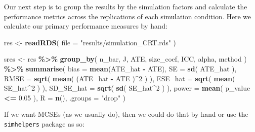 \documentclass[
]{book}
\newenvironment{Shaded}{\begin{snugshade}}{\end{snugshade}}
\newcommand{\AttributeTok}[1]{\textcolor[rgb]{0.13,0.29,0.53}{#1}}
\newcommand{\DecValTok}[1]{\textcolor[rgb]{0.00,0.00,0.81}{#1}}
\newcommand{\FloatTok}[1]{\textcolor[rgb]{0.00,0.00,0.81}{#1}}
\newcommand{\FunctionTok}[1]{\textcolor[rgb]{0.13,0.29,0.53}{\textbf{#1}}}
\newcommand{\NormalTok}[1]{#1}
\newcommand{\OtherTok}[1]{\textcolor[rgb]{0.56,0.35,0.01}{#1}}
\newcommand{\SpecialCharTok}[1]{\textcolor[rgb]{0.81,0.36,0.00}{\textbf{#1}}}
\newcommand{\StringTok}[1]{\textcolor[rgb]{0.31,0.60,0.02}{#1}}
\begin{document}
Our next step is to group the results by the simulation factors and calculate the performance metrics across the replications of each simulation condition.
Here we calculate our primary performance measures by hand:

\begin{Shaded}
\begin{Highlighting}[]
\NormalTok{res }\OtherTok{\textless{}{-}} \FunctionTok{readRDS}\NormalTok{( }\AttributeTok{file =} \StringTok{"results/simulation\_CRT.rds"}\NormalTok{ )}

\NormalTok{sres }\OtherTok{\textless{}{-}} 
\NormalTok{  res }\SpecialCharTok{\%\textgreater{}\%} 
  \FunctionTok{group\_by}\NormalTok{( n\_bar, J, ATE, size\_coef, ICC, alpha, method ) }\SpecialCharTok{\%\textgreater{}\%}
  \FunctionTok{summarise}\NormalTok{( }
    \AttributeTok{bias =} \FunctionTok{mean}\NormalTok{(ATE\_hat }\SpecialCharTok{{-}}\NormalTok{ ATE),}
    \AttributeTok{SE =} \FunctionTok{sd}\NormalTok{( ATE\_hat ),}
    \AttributeTok{RMSE =} \FunctionTok{sqrt}\NormalTok{( }\FunctionTok{mean}\NormalTok{( (ATE\_hat }\SpecialCharTok{{-}}\NormalTok{ ATE )}\SpecialCharTok{\^{}}\DecValTok{2}\NormalTok{ ) ),}
    \AttributeTok{ESE\_hat =} \FunctionTok{sqrt}\NormalTok{( }\FunctionTok{mean}\NormalTok{( SE\_hat}\SpecialCharTok{\^{}}\DecValTok{2}\NormalTok{ ) ),}
    \AttributeTok{SD\_SE\_hat =} \FunctionTok{sqrt}\NormalTok{( }\FunctionTok{sd}\NormalTok{( SE\_hat}\SpecialCharTok{\^{}}\DecValTok{2}\NormalTok{ ) ),}
    \AttributeTok{power =} \FunctionTok{mean}\NormalTok{( p\_value }\SpecialCharTok{\textless{}=} \FloatTok{0.05}\NormalTok{ ),}
    \AttributeTok{R =} \FunctionTok{n}\NormalTok{(),}
    \AttributeTok{.groups =} \StringTok{"drop"}
\NormalTok{  )}
\end{Highlighting}
\end{Shaded}

If we want MCSEs (as we usually do), then we could do that by hand or use the \texttt{simhelpers} package as so:
\end{document}
